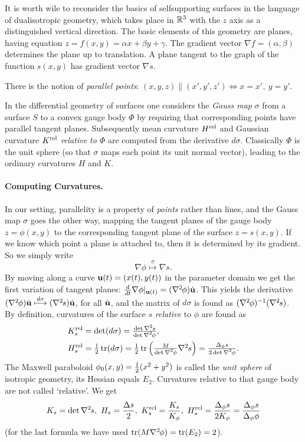 \documentclass[annual]{acmsiggraph}
\def\tr{\mathop{\textrm{tr}}\nolimits}
\def\rel{{\mathord{\text{\rm rel}}}}
\def\ess{s}
\def\Hess#1{{\def\testess{#1}\nabla^2\ifx\testess\ess\!s\else #1\fi}}
\def\Hess#1{\text{$\nabla^2\hskip-.2ex #1$}}
\begin{document}
It is worth wile to reconsider the basics of self\dash supporting surfaces 
in the language of dual\dash isotropic geometry, which takes place in 
${\mathbb R}^3$ with the $z$ axis as a distinguished vertical direction. The basic 
elements of this geometry are planes, having equation $z=f(x,y) = \alpha 
x+\beta y+\gamma$. The gradient vector $\nabla f = (\alpha,\beta)$ 
determines the plane up to translation. A plane tangent to the graph of 
the function $s(x,y)$ has gradient vector $\nabla s$.

There is the notion of {\em parallel points}:
	$
	(x,y,z) \parallel (x',y',z') \iff
	x=x',\ y=y'
	.$

In the differential geometry of surfaces one considers the {\em Gauss map} 
$\sigma$ from a surface $S$ to a convex gauge body $\Phi$ by requiring 
that corresponding points have parallel tangent planes.  Subsequently mean 
curvature $H^\rel$ and Gaussian curvature $K^\rel$ {\em relative to 
$\Phi$} are computed from the derivative $d\sigma$. Classically $\Phi$ is 
the unit sphere (so that $\sigma$ maps each point its unit normal vector), 
leading to the ordinary curvatures $H$ and $K$.


\paragraph{Computing Curvatures.}

In our setting, parallelity is a property of {\em points} rather than 
lines, and the Gauss map $\sigma$ goes the other way, mapping the tangent 
planes of the gauge body $z=\phi(x,y)$ to the corresponding tangent plane 
of the surface $z=s(x,y)$. If we know which point a plane is attached to, 
then it is determined by its gradient. So we simply write
	$$\nabla \phi\overset\sigma\longmapsto\nabla s.
	$$
 By moving along a curve ${\mathbf u}(t)=(x(t),y(t))$ in the parameter domain we 
get the first variation of tangent planes:
	$
	{d\over dt}\nabla \phi|_{\uw(t)} = 
	(\Hess\phi)\dot\uw
	$.
 This yields the derivative
	$	
	(\Hess\phi)\dot\uw \overset{d\sigma}\longmapsto
	(\Hess s)\dot\uw $,
 for all $\dot{{\mathbf u}}$, and the matrix of $d\sigma$ is found as 
$(\Hess\phi)^{-1}(\Hess s)$.  By definition, curvatures of the surface $s$ 
{\em relative} to $\phi$ are found as
	\begin{align*}
		K_s^\rel 
	& = \textstyle
		\det(d\sigma) =
		{\det\Hess s \over \det\Hess\phi} ,
	\\
		H_s^\rel
	&= \textstyle
		{1\over 2}\tr(d\sigma) 
		= {1\over 2}\tr \left({M\over\det\Hess\phi} \Hess s\right)
		=  {\Delta_\phi s \over 2\det\Hess\phi}.
	\end{align*}
 The Maxwell paraboloid $\phi_0(x,y)={1\over 2}(x^2+y^2)$ is called the 
{\em unit sphere} of isotropic geometry, its Hessian equals $E_2$. 
Curvatures relative to that gauge body are not called `relative'. We get
	\begin{align*}
	K_s = \det \Hess s, 
		\ 
	H_s = {\Delta s \over 2},
		\
	K_s^\rel = {K_s\over K_\phi},
		\
	H_s^\rel =  {\Delta_\phi s \over 2 K_\phi}
			= {\Delta_\phi s\over \Delta_\phi \phi}
	\end{align*}
 (for the last formula we have used $\tr (M\Hess\phi)=\tr(E_2)=2$).
\end{document}
